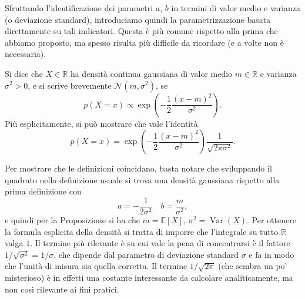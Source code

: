 \documentclass[
  italian,
  letterpaper,
]{book}
\newcommand{\bra}[1]{\left( #1 \right)}
\newcommand{\sqa}[1]{\left[ #1 \right]}
\newcommand{\R}{\mathbb{R}}
\newcommand{\E}[1]{\mathbb{E}\sqa{#1}}
\newcommand{\Var}[1]{\operatorname{Var}\bra{#1}}
\theoremstyle{definition}
\theoremstyle{remark}
\begin{document}
Sfruttando l'identificazione dei parametri \(a\), \(b\) in termini di
valor medio e varianza (o deviazione standard), introduciamo quindi la
parametrizzazione basata direttamente su tali indicatori. Questa è più
comune rispetto alla prima che abbiamo proposto, ma spesso risulta più
difficile da ricordare (e a volte non è necessaria).

Si dice che \(X \in \R\) ha densità continua gaussiana di valor medio
\(m \in \R\) e varianza \(\sigma^2>0\), e si scrive brevemente
\(\mathcal{N}(m, \sigma^2)\), se
\[ p(X=x ) \propto \exp\bra{ - \frac1 2 \frac {(x-m)^2} {\sigma^2} }.\]
Più esplicitamente, si può mostrare che vale l'identità
\[ p(X=x) =  \exp\bra{ - \frac1 2 \frac {(x-m)^2} {\sigma^2} } \frac{1}{\sqrt{ 2 \pi \sigma^2}}.\]

Per mostrare che le definizioni coincidano, basta notare che sviluppando
il quadrato nella definizione usuale si trova una densità gaussiana
rispetto alla prima definizione con
\[ a = -\frac{1}{2 \sigma^2} \quad b = \frac{m}{\sigma^2},\] e quindi
per la Proposizione si ha che \(m = \E{X}\), \(\sigma^2 = \Var{X}\). Per
ottenere la formula esplicita della densità si tratta di imporre che
l'integrale su tutto \(\R\) valga \(1\). Il termine più rilevante è su
cui vale la pena di concentrarsi è il fattore
\(1/\sqrt{\sigma^2} = 1/\sigma\), che dipende dal parametro di
deviazione standard \(\sigma\) e fa in modo che l'unità di misura sia
quella corretta. Il termine \(1/\sqrt{2 \pi}\) (che sembra un po'
misterioso) è in effetti una costante interessante da calcolare
analiticamente, ma non così rilevante ai fini pratici.
\end{document}
